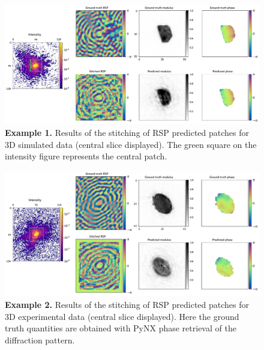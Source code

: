 \begin{figure}[H]
    \centering
    \includegraphics[width=\textwidth]{figures/Phasing/stitching_low_strain_sim.pdf}
    \caption{\textbf{Example 1.} Results of the stitching of RSP predicted patches for 3D simulated data (central slice displayed). The 
    green square on the intensity figure represents the central patch.}
    \label{fig:stitching_sim_low}
\end{figure}

\begin{figure}[H]
    \centering
    \includegraphics[width=\textwidth]{figures/Phasing/stitching_low_strain_exp.pdf}
    \caption{\textbf{Example 2.} Results of the stitching of RSP predicted patches for 3D experimental data (central 
    slice displayed). Here the ground truth quantities are obtained with PyNX phase retrieval of the diffraction 
    pattern. }
    \label{fig:stitching_exp_low}
\end{figure}

